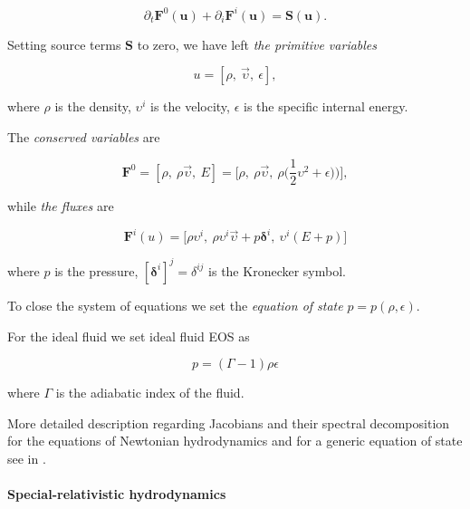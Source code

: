 \begin{equation}
\partial_t\boldsymbol{F}^0(\boldsymbol{u}) + \partial_i\boldsymbol{F}^i(\boldsymbol{u}) = \boldsymbol{S}(\boldsymbol{u}).
\end{equation}

Setting source terms $\boldsymbol{S}$ to zero, we have left \textit{the primitive variables} 

\begin{equation}
u = [\rho,\: \vec{\upsilon},\: \epsilon],
\end{equation}

where $\rho$ is the density, $\upsilon^{i}$ is the velocity, $\epsilon$ is the specific internal energy. 

The \textit{conserved variables} are 

\begin{equation}
\boldsymbol{F}^{0} = [\rho,\: \rho\vec{\upsilon},\: E] = \big[\rho, \: \rho\vec{\upsilon}, \: \rho\big(\frac{1}{2}\upsilon^2 + \epsilon\big)\big)\big],
\end{equation}

while \textit{the fluxes} are 

\begin{equation}
\boldsymbol{F}^i(u) = \big[ \rho\upsilon^i, \: \rho\upsilon^i\vec{\upsilon}+p\boldsymbol{\delta}^i, \: \upsilon^{i}(E+p) \big]
\end{equation}

where $p$ is the pressure, $[\boldsymbol{\delta}^i]^j = \delta^{ij}$ is the Kronecker symbol. 

To close the system of equations we set the \textit{equation of state} $p = p(\rho, \epsilon)$. 

For the ideal fluid we set ideal fluid EOS as

\begin{equation}
p = (\Gamma -1)\rho\epsilon
\end{equation}

where $\Gamma$ is the adiabatic index of the fluid. 

More detailed description regarding Jacobians and their spectral decomposition for the equations of Newtonian hydrodynamics and for a generic equation of state see in \cite{Kulikovskii:2002}.


\paragraph{Special-relativistic hydrodynamics}


